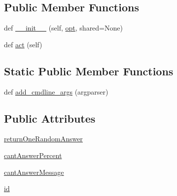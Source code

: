 \subsection*{Public Member Functions}
\begin{DoxyCompactItemize}
\item 
def \hyperlink{classparlai_1_1agents_1_1repeat__label_1_1repeat__label_1_1RepeatLabelAgent_ad2a5f628b5ae8d7a6798ef2646d53111}{\+\_\+\+\_\+init\+\_\+\+\_\+} (self, \hyperlink{classparlai_1_1core_1_1agents_1_1Agent_ab3b45d2754244608c75d4068b90cd051}{opt}, shared=None)
\item 
def \hyperlink{classparlai_1_1agents_1_1repeat__label_1_1repeat__label_1_1RepeatLabelAgent_adf5c764bc7ad29787ec7c82646450fed}{act} (self)
\end{DoxyCompactItemize}
\subsection*{Static Public Member Functions}
\begin{DoxyCompactItemize}
\item 
def \hyperlink{classparlai_1_1agents_1_1repeat__label_1_1repeat__label_1_1RepeatLabelAgent_a8b226276eb5fee84571f4dc84d967aa3}{add\+\_\+cmdline\+\_\+args} (argparser)
\end{DoxyCompactItemize}
\subsection*{Public Attributes}
\begin{DoxyCompactItemize}
\item 
\hyperlink{classparlai_1_1agents_1_1repeat__label_1_1repeat__label_1_1RepeatLabelAgent_a97ae22e8d6f0c58194ee3d92970918e7}{return\+One\+Random\+Answer}
\item 
\hyperlink{classparlai_1_1agents_1_1repeat__label_1_1repeat__label_1_1RepeatLabelAgent_a5885af67d30233a5825de7414d4244a1}{cant\+Answer\+Percent}
\item 
\hyperlink{classparlai_1_1agents_1_1repeat__label_1_1repeat__label_1_1RepeatLabelAgent_a761b9c11bf08499c0da88de5ec9fb406}{cant\+Answer\+Message}
\item 
\hyperlink{classparlai_1_1agents_1_1repeat__label_1_1repeat__label_1_1RepeatLabelAgent_a5899e38c5ac0dab28f9e19bd8e4de669}{id}
\end{DoxyCompactItemize}


